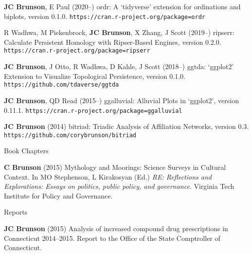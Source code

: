\documentclass[10pt,a4paper]{article}
\begin{document}
\begin{enumerate}[label={[\arabic*]},labelindent=1cm,nolistsep]
\item
{\bfseries JC Brunson}, E Paul (2020--) {\sffamily ordr}: A `tidyverse' extension for ordinations and biplots, version 0.1.0. {\tt\small\nolinkurl{https://cran.r-project.org/package=ordr}}
\item
R Wadhwa, M Piekenbrock, {\bfseries JC Brunson}, X Zhang, J Scott (2019--) {\sffamily ripserr}: Calculate Persistent Homology with Ripser-Based Engines, version 0.2.0. {\tt\small\nolinkurl{https://cran.r-project.org/package=ripserr}}
\item
{\bfseries JC Brunson}, J Otto, R Wadhwa, D Kahle, J Scott (2018--) {\sffamily ggtda}: `ggplot2' Extension to Visualize Topological Persistence, version 0.1.0. {\tt\small\nolinkurl{https://github.com/tdaverse/ggtda}}
\item
{\bfseries JC Brunson}, QD Read (2015--) {\sffamily ggalluvial}: Alluvial Plots in `ggplot2', version 0.11.1. {\tt\small\nolinkurl{https://cran.r-project.org/package=ggalluvial}}
\item
{\bfseries JC Brunson} (2014) {\sffamily bitriad}: Triadic Analysis of Affiliation Networks, version 0.3. {\tt\small\nolinkurl{https://github.com/corybrunson/bitriad}}
\setcounter{paper}{\value{enumi}}
\end{enumerate}
%
\vspace{.25cm}
{\sc Book Chapters}
\begin{enumerate}[label={[\arabic*]},labelindent=1cm,nolistsep]
\item
{\bfseries C Brunson} (2015) Mythology and Moorings: Science Surveys in Cultural Context. In MO Stephenson, L Kirakosyan (Ed.) {\itshape RE: Reflections and Explorations: Essays on politics, public policy, and governance}. Virginia Tech Institute for Policy and Governance.
\setcounter{paper}{\value{enumi}}
\end{enumerate}
%
\vspace{.25cm}
{\sc Reports}
\begin{enumerate}[label={[\arabic*]},labelindent=1cm,nolistsep]
\item
{\bfseries JC Brunson} (2015) Analysis of increased compound drug prescriptions in Connecticut 2014--2015. Report to the Office of the State Comptroller of Connecticut.
\setcounter{paper}{\value{enumi}}
\end{enumerate}

\end{document}
